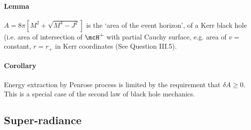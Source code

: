 \paragraph{Lemma}  $A=8\pi\left[M^2+\sqrt{M^4-J^2}\right]$ is the `area of 
the event horizon', of a Kerr black hole (i.e. area of intersection of $\mcH^+$
with partial Cauchy surface, e.g. area of $v=$ constant, $r=r_+$ in Kerr
coordinates (See Question III.5).

\paragraph{Corollary}  Energy extraction by Penrose process is limited by 
the requirement that $\delta A \ge 0$.  This is a special case of the second 
law of black hole mechanics.

\subsection{Super-radiance}

